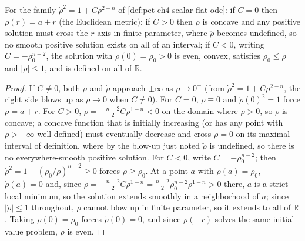 \begin{proposition}
  \label{prop:pet-ch4-scalar-flat-cases}
  For the family $\dot\rho^2=1+C\rho^{2-n}$ of \cref{def:pet-ch4-scalar-flat-ode}:
  if $C=0$ then $\rho(r)=a+r$ (the Euclidean metric); if $C>0$ then $\rho$ is
  concave and any positive solution must cross the $r$-axis in finite parameter,
  where $\ddot\rho$ becomes undefined, so no smooth positive solution exists on
  all of an interval; if $C<0$, writing $C=-\rho_0^{n-2}$, the solution with
  $\rho(0)=\rho_0>0$ is even, convex, satisfies $\rho_0\le\rho$ and $|\dot\rho|\le1$,
  and is defined on all of $\mathbb{R}$.
\end{proposition}
\begin{proof}
  If $C\ne0$, both $\rho$ and $\dot\rho$ approach $\pm\infty$ as $\rho\to0^+$ (from
  $\dot\rho^2=1+C\rho^{2-n}$, the right side blows up as $\rho\to0$ when
  $C\ne0$). For $C=0$, $\ddot\rho\equiv0$ and $\dot\rho(0)^2=1$ force
  $\rho=a+r$. For $C>0$, $\ddot\rho=-\tfrac{n-2}2C\rho^{1-n}<0$ on the domain
  where $\rho>0$, so $\rho$ is concave; a concave function that is initially
  increasing (or has any point with $\dot\rho>-\infty$ well-defined) must
  eventually decrease and cross $\rho=0$ on its maximal interval of definition,
  where by the blow-up just noted $\ddot\rho$ is undefined, so there is no
  everywhere-smooth positive solution. For $C<0$, write $C=-\rho_0^{n-2}$; then
  $\dot\rho^2=1-(\rho_0/\rho)^{n-2}\ge0$ forces $\rho\ge\rho_0$. At a point $a$
  with $\rho(a)=\rho_0$, $\dot\rho(a)=0$ and, since
  $\ddot\rho=-\tfrac{n-2}2C\rho^{1-n}=\tfrac{n-2}2\rho_0^{n-2}\rho^{1-n}>0$ there,
  $a$ is a strict local minimum, so the solution extends smoothly in a
  neighborhood of $a$; since $|\dot\rho|\le1$ throughout, $\rho$ cannot blow up
  in finite parameter, so it extends to all of $\mathbb{R}$. Taking $\rho(0)=\rho_0$
  forces $\dot\rho(0)=0$, and since $\rho(-r)$ solves the same initial value
  problem, $\rho$ is even.
\end{proof}

